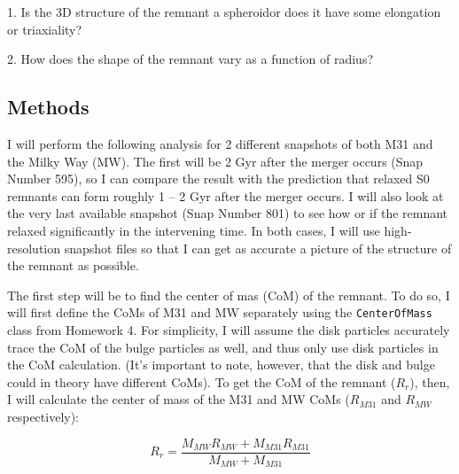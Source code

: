 \documentclass[linenumbers]{aastex631}
\begin{document}
1. Is the 3D structure of the remnant a spheroidor does it have some elongation or triaxiality?

2. How does the shape of the remnant vary as a function of radius?

\subsection{Methods}

I will perform the following analysis for 2 different snapshots of both M31 and the Milky Way (MW). 
The first will be 2 Gyr after the merger occurs (Snap Number 595), so I can compare the result with the prediction that relaxed S0 remnants can form roughly 1 -- 2 Gyr after the merger occurs.
I will also look at the very last available snapshot (Snap Number 801) to see how or if the remnant relaxed significantly in the intervening time.
In both cases, I will use high-resolution snapshot files so that I can get as accurate a picture of the structure of the remnant as possible.

The first step will be to find the center of mas (CoM) of the remnant. 
To do so, I will first define the CoMs of M31 and MW separately using the \texttt{CenterOfMass} class from Homework 4. 
For simplicity, I will assume the disk particles accurately trace the CoM of the bulge particles as well, and thus only use disk particles in the CoM calculation. 
(It's important to note, however, that the disk and bulge could in theory have different CoMs).
To get the CoM of the remnant ($R_r$), then, I will calculate the center of mass of the M31 and MW CoMs ($R_{M31}$ and $R_{MW}$ respectively):

\begin{equation}\label{eq:CoM}
    R_r = \frac{M_{MW}R_{MW} + M_{M31}R_{M31}}{M_{MW}+M_{M31}}
\end{equation}
\end{document}
